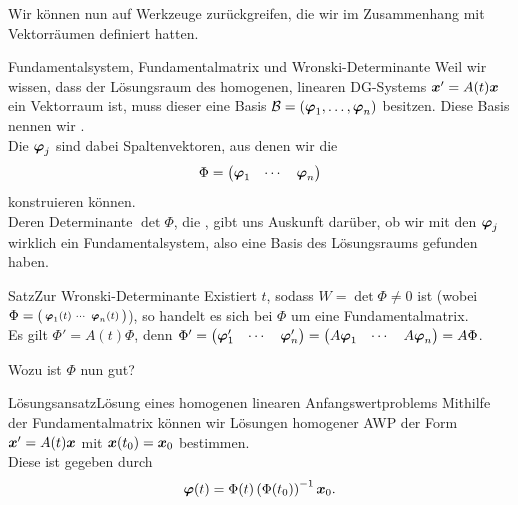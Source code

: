 Wir können nun auf Werkzeuge zurückgreifen, die wir im Zusammenhang mit Vektorräumen definiert hatten.
\begin{Def}
{Fundamentalsystem{,} Fundamentalmatrix und Wronski-Determinante}
Weil wir wissen, dass der Lösungsraum des homogenen, linearen DG-Systems ${{\text{\boldmath${x}$}}}'=A(t){{\text{\boldmath${x}$}}}$ ein Vektorraum ist, muss dieser eine Basis $\mathcal{B}=({{\text{\boldmath${\varphi}$}}}_1,\ldots,{{\text{\boldmath${\varphi}$}}}_n)$ besitzen. Diese Basis nennen wir .\\
Die ${{\text{\boldmath${\varphi}$}}}_j$ sind dabei Spaltenvektoren, aus denen wir die 
\begin{equation*}
    \Phi =\begin{pmatrix}{{\text{\boldmath${\varphi}$}}}_1&\cdots&{{\text{\boldmath${\varphi}$}}}_n\end{pmatrix}
\end{equation*}
konstruieren können.\\
Deren Determinante $\det\Phi$, die , gibt uns Auskunft darüber, ob wir mit den ${{\text{\boldmath${\varphi}$}}}_j$ wirklich ein Fundamentalsystem, also eine Basis des Lösungsraums gefunden haben.
\end{Def}
\begin{Satz}
{Satz}{Zur Wronski-Determinante}
Existiert $t$, sodass $W=\det\Phi\neq0$ ist (wobei $\Phi=\left(\begin{smallmatrix}{{\text{\boldmath${\varphi}$}}}_1(t)&\cdots&{{\text{\boldmath${\varphi}$}}}_n(t)\end{smallmatrix}\right)$), so handelt es sich bei $\Phi$ um eine Fundamentalmatrix.\\
Es gilt $\Phi'=A(t)\Phi$, denn $\Phi'=\begin{pmatrix}{{\text{\boldmath${\varphi}$}}}'_1&\cdots&{{\text{\boldmath${\varphi}$}}}'_n\end{pmatrix}=\begin{pmatrix}A{{\text{\boldmath${\varphi}$}}}_1&\cdots&A{{\text{\boldmath${\varphi}$}}}_n\end{pmatrix}=A\Phi$.
\end{Satz}
Wozu ist $\Phi$ nun gut?
\begin{Satz}
{Lösungsansatz}{Lösung eines homogenen linearen Anfangswertproblems}
Mithilfe der Fundamentalmatrix können wir Lösungen homogener AWP der Form ${{\text{\boldmath${x}$}}}'=A(t){{\text{\boldmath${x}$}}}$ mit ${{\text{\boldmath${x}$}}}(t_0)={{\text{\boldmath${x}$}}}_0$ bestimmen.\\
Diese ist gegeben durch
\begin{equation*}
    {{\text{\boldmath${\varphi}$}}}(t)=\Phi(t)\left({\Phi(t_0)}\right)^{-1}{{\text{\boldmath${x}$}}}_0.
\end{equation*}
\end{Satz}
